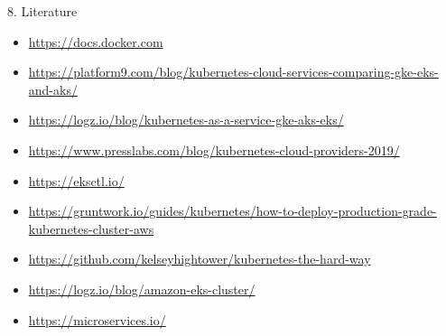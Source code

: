 \documentclass{beamer}
\begin{document}
\begin{frame}{8. Literature}%
	\tiny{
\begin{itemize}
\item \url{https://docs.docker.com}
\item \url{https://platform9.com/blog/kubernetes-cloud-services-comparing-gke-eks-and-aks/}
\item \url{https://logz.io/blog/kubernetes-as-a-service-gke-aks-eks/}
\item \url{https://www.presslabs.com/blog/kubernetes-cloud-providers-2019/}
\item \url{https://eksctl.io/}
\item \url{https://gruntwork.io/guides/kubernetes/how-to-deploy-production-grade-kubernetes-cluster-aws}
\item \url{https://github.com/kelseyhightower/kubernetes-the-hard-way}
\item \url{https://logz.io/blog/amazon-eks-cluster/}
\item \url{https://microservices.io/}
\end{itemize}
	}
\end{frame}
\end{document}
